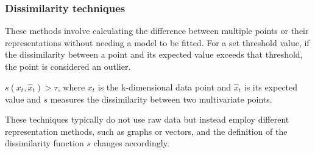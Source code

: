 \subsubsection{Dissimilarity techniques}
\label{ss:dissimilarity-univariate}
These methods involve calculating the difference between multiple points or their representations without needing a model to be fitted. For a set threshold value, if the dissimilarity between a point and its expected value exceeds that threshold, the point is considered an outlier. 
\begin{definition}\label{def:model-based}
    $s(x_t, \hat{x}_t) > \tau $, where $x_t$ is the k-dimensional data point and $\hat{x}_t$ is its expected value and $s$ measures the dissimilarity between two multivariate points.
\end{definition}
These techniques typically do not use raw data but instead employ different representation methods, such as graphs or vectors, and the definition of the dissimilarity function $s$ changes accordingly.



